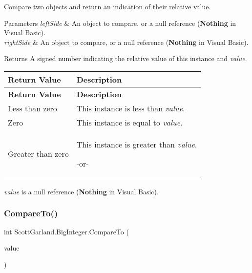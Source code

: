 Compare two objects and return an indication of their relative value. 


\begin{DoxyParams}{Parameters}
{\em left\+Side} & An object to compare, or a null reference ({\bfseries Nothing} in Visual Basic).\\
\hline
{\em right\+Side} & An object to compare, or a null reference ({\bfseries Nothing} in Visual Basic).\\
\hline
\end{DoxyParams}
\begin{DoxyReturn}{Returns}
A signed number indicating the relative value of this instance and {\itshape value}. \tabulinesep=1mm
\begin{longtabu} spread 0pt [c]{*{2}{|X[-1]}|}
\hline
\rowcolor{\tableheadbgcolor}\textbf{ Return Value }&\textbf{ Description  }\\
\endfirsthead
\hline
\endfoot
\hline
\rowcolor{\tableheadbgcolor}\textbf{ Return Value }&\textbf{ Description  }\\
\endhead
Less than zero &This instance is less than {\itshape value}.  \\
Zero &This instance is equal to {\itshape value}.  \\
Greater than zero &This instance is greater than {\itshape value}. 

-\/or-\/\\
\end{longtabu}

\end{DoxyReturn}
{\itshape value} is a null reference ({\bfseries Nothing} in Visual Basic).   \mbox{\label{class_scott_garland_1_1_big_integer_af0dbbd3bc5d77875df55f35d92f1e2b6}} 
\subsubsection{\texorpdfstring{Compare\+To()}{CompareTo()}}
{\footnotesize\ttfamily int Scott\+Garland.\+Big\+Integer.\+Compare\+To (\begin{DoxyParamCaption}\item[{\hyperlink{class_scott_garland_1_1_big_integer}{Big\+Integer}}]{value }\end{DoxyParamCaption})\hspace{0.3cm}{\ttfamily [inline]}}



